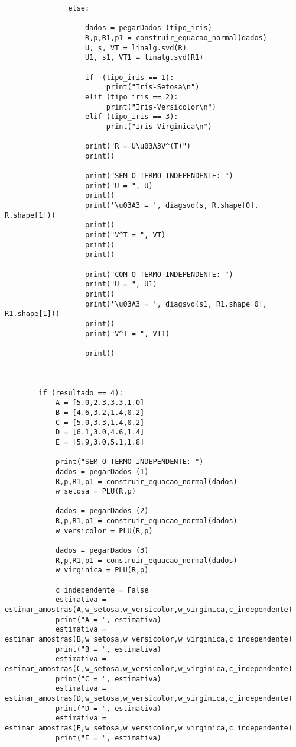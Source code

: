 \documentclass[a4paper,12pt,twoside]{article}
\begin{document}
\begin{lstlisting}
               else:
                
                   dados = pegarDados (tipo_iris)
                   R,p,R1,p1 = construir_equacao_normal(dados)
                   U, s, VT = linalg.svd(R)
                   U1, s1, VT1 = linalg.svd(R1)
                   
                   if  (tipo_iris == 1):
                        print("Iris-Setosa\n")
                   elif (tipo_iris == 2):
                        print("Iris-Versicolor\n")
                   elif (tipo_iris == 3):
                        print("Iris-Virginica\n")
                        
                   print("R = U\u03A3V^(T)")
                   print()
                   
                   print("SEM O TERMO INDEPENDENTE: ")
                   print("U = ", U)
                   print()
                   print('\u03A3 = ', diagsvd(s, R.shape[0], R.shape[1]))
                   print()
                   print("V^T = ", VT)
                   print()
                   print()
                    
                   print("COM O TERMO INDEPENDENTE: ")
                   print("U = ", U1)
                   print()
                   print('\u03A3 = ', diagsvd(s1, R1.shape[0], R1.shape[1]))
                   print()
                   print("V^T = ", VT1)
                   
                   print()
                   
               
                
        if (resultado == 4):
            A = [5.0,2.3,3.3,1.0]
            B = [4.6,3.2,1.4,0.2]
            C = [5.0,3.3,1.4,0.2]
            D = [6.1,3.0,4.6,1.4]
            E = [5.9,3.0,5.1,1.8]
            
            print("SEM O TERMO INDEPENDENTE: ")
            dados = pegarDados (1)
            R,p,R1,p1 = construir_equacao_normal(dados)
            w_setosa = PLU(R,p)
            
            dados = pegarDados (2)
            R,p,R1,p1 = construir_equacao_normal(dados)
            w_versicolor = PLU(R,p)
        
            dados = pegarDados (3)
            R,p,R1,p1 = construir_equacao_normal(dados)
            w_virginica = PLU(R,p)
            
            c_independente = False
            estimativa = estimar_amostras(A,w_setosa,w_versicolor,w_virginica,c_independente)
            print("A = ", estimativa)
            estimativa = estimar_amostras(B,w_setosa,w_versicolor,w_virginica,c_independente)
            print("B = ", estimativa)
            estimativa = estimar_amostras(C,w_setosa,w_versicolor,w_virginica,c_independente)
            print("C = ", estimativa)
            estimativa = estimar_amostras(D,w_setosa,w_versicolor,w_virginica,c_independente)
            print("D = ", estimativa)
            estimativa = estimar_amostras(E,w_setosa,w_versicolor,w_virginica,c_independente)
            print("E = ", estimativa)
            

\end{lstlisting}
\end{document}
